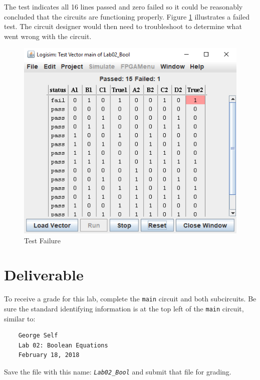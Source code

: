 The test indicates all 16 lines passed and zero failed so it could be reasonably concluded that the circuits are functioning properly. Figure \ref{fig:02-08} illustrates a failed test. The circuit designer would then need to troubleshoot to determine what went wrong with the circuit.

\begin{figure}[H]
	\centering
	\includegraphics[width=\maxwidth{.95\linewidth}]{gfx/02-08}
	\caption{Test Failure}
	\label{fig:02-08}
\end{figure}

\section{Deliverable}

To receive a grade for this lab, complete the \lstinline[columns=fixed]|main| circuit and both subcircuits. Be sure the standard identifying information is at the top left of the \lstinline[columns=fixed]|main| circuit, similar to: 

\bigskip
\begin{minipage}{\linewidth}
	\begin{verbatim}
	George Self
	Lab 02: Boolean Equations
	February 18, 2018
	\end{verbatim}
\end{minipage}
\bigskip

Save the file with this name: \emph{\texttt{Lab02\_Bool}} and submit that file for grading.

